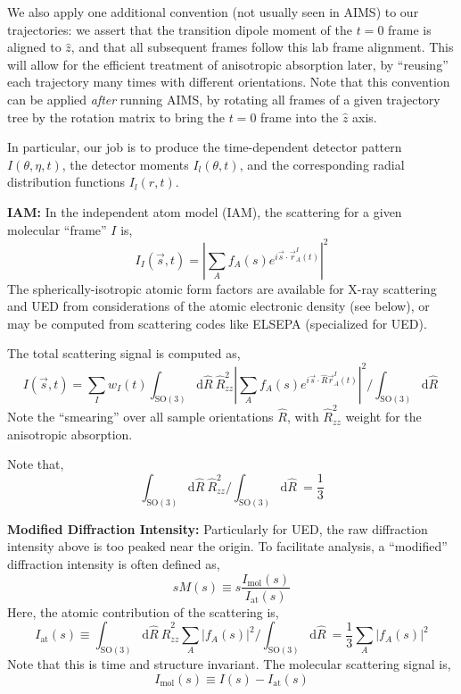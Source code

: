 \documentclass[fleqn,oneside,12pt]{article}
\begin{document}
We also apply one additional convention (not usually seen in AIMS) to our
trajectories: we assert that the transition dipole moment of the $t=0$ frame is
aligned to $\hat z$, and that all subsequent frames follow this lab frame
alignment. This will allow for the efficient treatment of anisotropic absorption
later, by ``reusing'' each trajectory many times with different orientations.
Note that this convention can be applied \emph{after} running AIMS, by rotating
all frames of a given trajectory tree by the rotation matrix to bring the $t=0$
frame into the $\hat z$ axis.

In particular, our job is to produce the time-dependent detector pattern $I
(\theta, \eta, t)$, the detector moments $I_{l} (\theta, t)$, and the
corresponding radial distribution functions $I_{l} (r, t)$.

\textbf{IAM:} In the independent atom model (IAM), the scattering for a given
molecular ``frame'' $I$ is,
\[
I_{I} (\vec s, t)
=   
\left |
\sum_{A}
f_{A} (s)
e^{i \vec s \cdot \vec r_{A}^{I} (t)}
\right |^2
\]
The spherically-isotropic atomic form factors are available for X-ray scattering
and UED from considerations of the atomic electronic density (see below), or may
be computed from scattering codes like ELSEPA (specialized for UED).

The total scattering signal is computed as,
\[
I (\vec s, t)
=
\sum_{I}
w_{I} (t)
\int_{\mathrm{SO(3)}}
\mathrm{d} \hat R \
\hat R_{zz}^2
\left |
\sum_{A}
f_{A} (s)
e^{i \vec s \cdot \hat R \vec r_{A}^{I} (t)}
\right |^2
/ 
\int_{\mathrm{SO(3)}}
\mathrm{d} \hat R \
\]
Note the ``smearing'' over all sample orientations $\hat R$, with $\hat
R_{zz}^2$ weight for the anisotropic absorption.

Note that,
\[
\int_{\mathrm{SO(3)}}
\mathrm{d} \hat R \
\hat R_{zz}^2
/ 
\int_{\mathrm{SO(3)}}
\mathrm{d} \hat R \
=
\frac{1}{3}
\]

\textbf{Modified Diffraction Intensity:} Particularly for UED, the raw
diffraction intensity above is too peaked near the origin. To facilitate
analysis, a ``modified'' diffraction intensity is often defined as,
\[
s M(s)
\equiv
s
\frac{I_{\mathrm{mol}} (s)}{I_{\mathrm{at}} (s)}
\]
Here, the atomic contribution of the scattering is,
\[
I_{\mathrm{at}} (s)
\equiv
\int_{\mathrm{SO(3)}}
\mathrm{d} \hat R \
\hat R_{zz}^2
\sum_{A}
\left |
f_{A} (s)
\right |^2
/ 
\int_{\mathrm{SO(3)}}
\mathrm{d} \hat R \
=
\frac{1}{3}
\sum_{A} | f_{A} (s) |^2
\]
Note that this is time and structure invariant. The molecular scattering signal
is,
\[
I_{\mathrm{mol}} (s)
\equiv
I (s)
-
I_{\mathrm{at}} (s)
\]
\end{document}
